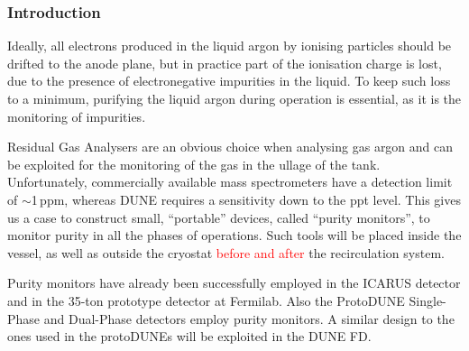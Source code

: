 \subsubsection{Introduction}
\label{sec:prm-intro}
Ideally, all electrons produced in the liquid argon by ionising particles should be drifted to the anode plane, but in practice part of the ionisation charge is lost, due to the presence of electronegative impurities in the liquid. To keep such loss to a minimum, purifying the liquid argon during operation is essential, as it is the monitoring of impurities.

Residual Gas Analysers are an obvious choice when analysing gas argon and can be exploited for the monitoring of the gas in the ullage of the tank. Unfortunately, commercially available mass spectrometers have a detection limit of $\sim$1\,ppm, whereas DUNE requires a sensitivity down to the ppt level. This gives us a case to construct small, ``portable'' devices, called ``purity monitors'', to monitor purity in all the phases of operations. Such tools will be placed inside the vessel, as well as outside the cryostat \textcolor{red}{before and after} the recirculation system.

Purity monitors have already been successfully employed in the ICARUS detector and in the 35-ton prototype detector at Fermilab. Also the ProtoDUNE Single-Phase and Dual-Phase detectors employ purity monitors. A similar design to the ones used in the protoDUNEs will be exploited in the DUNE FD. 
